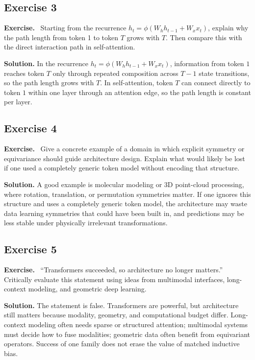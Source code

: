 \documentclass[11pt]{article}
\newenvironment{exercisebox}{\begin{framed}\noindent\textbf{Exercise.}\ }{\end{framed}}
\begin{document}
\subsection*{Exercise 3}
\begin{exercisebox}
Starting from the recurrence
    \(h_t = \phi(W_h h_{t-1}+W_x x_t)\), explain why the path length from token 1 to token \(T\) grows with \(T\).
    Then compare this with the direct interaction path in self-attention.
\end{exercisebox}
\textbf{Solution.} In the recurrence $h_t=\phi(W_hh_{t-1}+W_xx_t)$, information from token $1$ reaches token $T$ only through repeated composition across $T-1$ state transitions, so the path length grows with $T$. In self-attention, token $T$ can connect directly to token $1$ within one layer through an attention edge, so the path length is constant per layer.

\subsection*{Exercise 4}
\begin{exercisebox}
Give a concrete example of a domain in which explicit symmetry or equivariance should guide architecture design.
    Explain what would likely be lost if one used a completely generic token model without encoding that structure.
\end{exercisebox}
\textbf{Solution.} A good example is molecular modeling or 3D point-cloud processing, where rotation, translation, or permutation symmetries matter. If one ignores this structure and uses a completely generic token model, the architecture may waste data learning symmetries that could have been built in, and predictions may be less stable under physically irrelevant transformations.

\subsection*{Exercise 5}
\begin{exercisebox}
``Transformers succeeded, so architecture no longer matters.''
    Critically evaluate this statement using ideas from multimodal interfaces, long-context modeling, and geometric deep learning.
\end{exercisebox}
\textbf{Solution.} The statement is false. Transformers are powerful, but architecture still matters because modality, geometry, and computational budget differ. Long-context modeling often needs sparse or structured attention; multimodal systems must decide how to fuse modalities; geometric data often benefit from equivariant operators. Success of one family does not erase the value of matched inductive bias.
\end{document}
